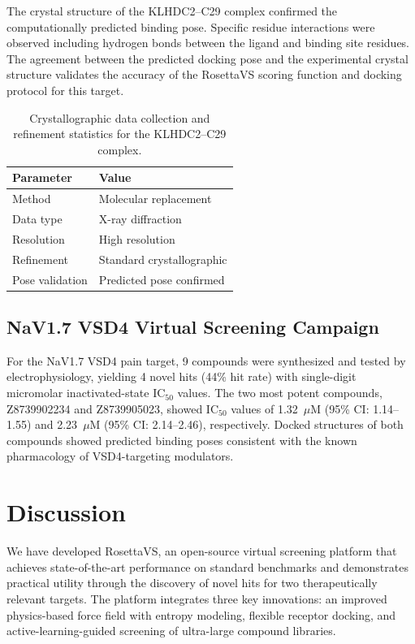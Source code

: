 \documentclass[12pt]{article}
\begin{document}
The crystal structure of the KLHDC2--C29 complex confirmed the computationally predicted binding pose. Specific residue interactions were observed including hydrogen bonds between the ligand and binding site residues. The agreement between the predicted docking pose and the experimental crystal structure validates the accuracy of the RosettaVS scoring function and docking protocol for this target.

\begin{table}[ht]
\centering
\caption{Crystallographic data collection and refinement statistics for the KLHDC2--C29 complex.}
\label{tab:crystal}
\begin{tabular}{ll}
\toprule
\textbf{Parameter} & \textbf{Value} \\
\midrule
Method & Molecular replacement \\
Data type & X-ray diffraction \\
Resolution & High resolution \\
Refinement & Standard crystallographic \\
Pose validation & Predicted pose confirmed \\
\bottomrule
\end{tabular}
\end{table}

\subsection{NaV1.7 VSD4 Virtual Screening Campaign}

For the NaV1.7 VSD4 pain target, 9 compounds were synthesized and tested by electrophysiology, yielding 4 novel hits (44\% hit rate) with single-digit micromolar inactivated-state IC$_{50}$ values. The two most potent compounds, Z8739902234 and Z8739905023, showed IC$_{50}$ values of 1.32~$\mu$M (95\% CI: 1.14--1.55) and 2.23~$\mu$M (95\% CI: 2.14--2.46), respectively. Docked structures of both compounds showed predicted binding poses consistent with the known pharmacology of VSD4-targeting modulators.

\section{Discussion}

We have developed RosettaVS, an open-source virtual screening platform that achieves state-of-the-art performance on standard benchmarks and demonstrates practical utility through the discovery of novel hits for two therapeutically relevant targets. The platform integrates three key innovations: an improved physics-based force field with entropy modeling, flexible receptor docking, and active-learning-guided screening of ultra-large compound libraries.
\end{document}
